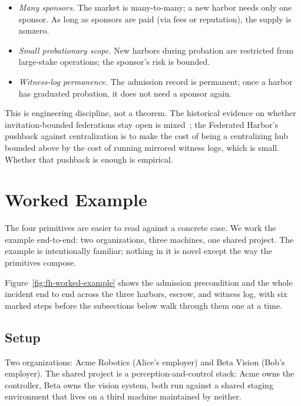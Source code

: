 \documentclass[11pt,a4paper]{article}
\theoremstyle{definition}
\theoremstyle{remark}
\begin{document}
\begin{itemize}[nosep]
\item \emph{Many sponsors.} The market is many-to-many; a new harbor needs only one sponsor. As long as sponsors are paid (via fees or reputation), the supply is nonzero.
\item \emph{Small probationary scope.} New harbors during probation are restricted from large-stake operations; the sponsor's risk is bounded.
\item \emph{Witness-log permanence.} The admission record is permanent; once a harbor has graduated probation, it does not need a sponsor again.
\end{itemize}

This is engineering discipline, not a theorem. The historical evidence on whether invitation-bounded federations stay open is mixed~; the Federated Harbor's pushback against centralization is to make the cost of being a centralizing hub bounded above by the cost of running mirrored witness logs, which is small. Whether that pushback is enough is empirical.

\section{Worked Example}\label{sec:fh-worked-example}

The four primitives are easier to read against a concrete case. We work the example end-to-end: two organizations, three machines, one shared project. The example is intentionally familiar; nothing in it is novel except the way the primitives compose.

Figure~\ref{fig:fh-worked-example} shows the admission precondition and the
whole incident end to end across the three harbors, escrow, and witness log,
with six marked steps before the subsections below walk through them one at a
time.



\subsection{Setup}\label{sec:fh-ex-setup}

Two organizations: Acme Robotics (Alice's employer) and Beta Vision (Bob's employer). The shared project is a perception-and-control stack: Acme owns the controller, Beta owns the vision system, both run against a shared staging environment that lives on a third machine maintained by neither.
\end{document}
